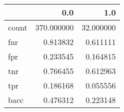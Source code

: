 \begin{tabular}{lrr}
\toprule
{} &         0.0 &        1.0 \\
\midrule
count &  370.000000 &  32.000000 \\
fnr   &    0.813832 &   0.611111 \\
fpr   &    0.233545 &   0.164815 \\
tnr   &    0.766455 &   0.612963 \\
tpr   &    0.186168 &   0.055556 \\
bacc  &    0.476312 &   0.223148 \\
\bottomrule
\end{tabular}

